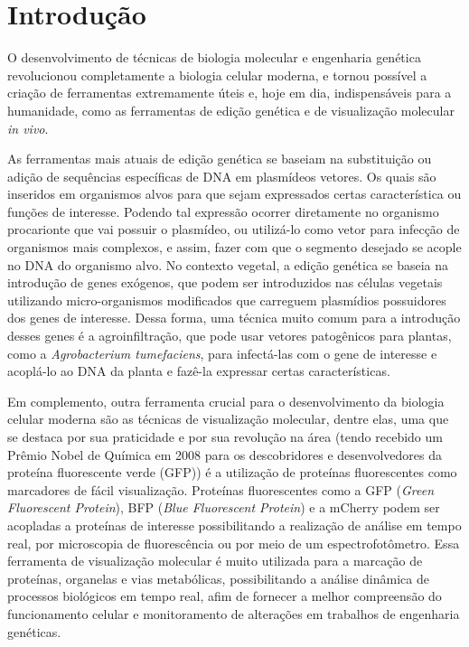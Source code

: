 \section{Introdução} 
O desenvolvimento de técnicas de biologia molecular e engenharia genética
revolucionou completamente a biologia celular moderna, e tornou possível a
criação de ferramentas extremamente úteis e, hoje em dia, indispensáveis para a
humanidade\cite{teófilo_gallão_2019}, como as ferramentas de edição genética e
de visualização molecular \textit{in vivo}.

As ferramentas mais atuais de edição genética se baseiam na substituição ou
adição de sequências específicas de DNA em plasmídeos
vetores\cite{BriefyHistoryOfGenetics}. Os quais são inseridos em organismos
alvos para que sejam expressados certas característica ou funções de interesse.
Podendo tal expressão ocorrer diretamente no organismo procarionte que vai
possuir o plasmídeo\cite{ruiz_silhavy_2022}, ou utilizá-lo como vetor para
infecção de organismos mais complexos, e assim, fazer com que o segmento
desejado se acople no DNA do organismo alvo. No contexto vegetal, a edição
genética se baseia na introdução de genes exógenos, que podem ser introduzidos
nas células vegetais utilizando micro-organismos modificados que carreguem
plasmídios possuidores dos genes de interesse\cite{embrapa2017manual}. Dessa
forma, uma técnica muito comum para a introdução desses genes é a
agroinfiltração, que pode usar vetores patogênicos para plantas, como a
\textit{Agrobacterium tumefaciens}, para infectá-las com o gene de interesse e
acoplá-lo ao DNA da planta e fazê-la expressar certas
características\cite{embrapa2017manual}.

Em complemento, outra ferramenta crucial para o desenvolvimento da biologia
celular moderna são as técnicas de visualização molecular, dentre elas, uma que
se destaca por sua praticidade e por sua revolução na área (tendo recebido um
Prêmio Nobel de Química em 2008 para os descobridores e desenvolvedores da
proteína fluorescente verde (GFP)\cite{jeremy_jackson_2009}) é a utilização de
proteínas fluorescentes como marcadores de fácil visualização. Proteínas
fluorescentes como a GFP (\textit{Green Fluorescent Protein}), BFP (\textit{Blue
Fluorescent Protein}) e a mCherry podem ser acopladas a proteínas de interesse
possibilitando a realização de análise em tempo real, por microscopia de
fluorescência ou por meio de um espectrofotômetro.  Essa ferramenta de
visualização molecular é muito utilizada para a marcação de proteínas,
organelas e vias metabólicas, possibilitando a análise dinâmica de processos
biológicos em tempo real, afim de fornecer a melhor compreensão do funcionamento
celular e monitoramento de alterações em trabalhos de engenharia
genéticas\cite{misteli_spector_1997}. 

